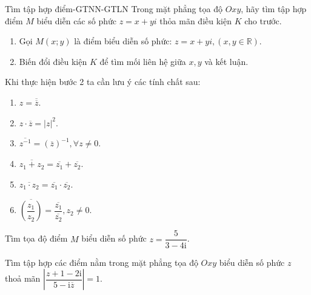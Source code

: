 \begin{dang}{Tìm tập hợp điểm-GTNN-GTLN}
Trong mặt phẳng tọa độ $Oxy$, hãy tìm tập hợp điểm $M$ biểu diễn các số phức $z=x+yi$ thỏa mãn điều kiện $K$ cho trước.
\begin{enumerate}[Bước 1.]
\item Gọi $M(x; y)$ là điểm biểu diễn số phức: $z=x+yi, (x, y\in\mathbb{R})$.
\item Biến đổi điều kiện $K$ để tìm mối liên hệ giữa $x, y$ và kết luận.
\end{enumerate}
Khi thực hiện bước 2 ta cần lưu ý các tính chất sau:
\begin{multicols}{3}
\begin{enumerate}[1.]
\item $z=\overline{\overline{z}}$.
\item $z\cdot\overline{z}=|z|^2$.
\item $\overline{z^{-1}}=\left(\overline{z}\right)^{-1},\forall z\neq 0$.
\item $\overline{z_1+z_2}=\overline{z_1}+\overline{z_2}$.
\item $\overline{z_1\cdot z_2}=\overline{z_1}\cdot\overline{z_2}$.
\item $\overline{\left(\dfrac{z_1}{z_2}\right)}=\dfrac{\overline{z_1}}{\overline{z_2}}, z_2\neq 0$.
\end{enumerate}
\end{multicols}
\end{dang}

\begin{vd}%
Tìm tọa độ điểm  $M$  biểu diễn số phức $z=\dfrac{5}{3-4\mathrm{i}}$.
\end{vd}

\begin{vd}%
Tìm tập hợp các điểm nằm trong mặt phẳng tọa độ $Oxy$ biểu diễn số phức $z$ thoả mãn $\left|\dfrac{z+1-2\mathrm{i}}{5-\mathrm{i} \overline{z}}\right|=1$.
\end{vd}

